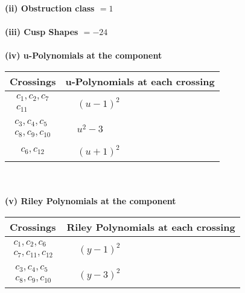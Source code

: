 \documentclass[1p]{elsarticle_modified}
\theoremstyle{definition}
\begin{document}
\flushleft \textbf{(ii) Obstruction class $= 1$}\\~\\
\flushleft \textbf{(iii) Cusp Shapes $= -24$}\\~\\
\newpage\renewcommand{\arraystretch}{1}
\flushleft \textbf{(iv) u-Polynomials at the component}\newline \\
\begin{tabular}{m{50pt}|m{274pt}}
Crossings & \hspace{64pt}u-Polynomials at each crossing \\
\hline $$\begin{aligned}c_{1},c_{2},c_{7}\\c_{11}\end{aligned}$$&$\begin{aligned}
&(u-1)^2
\end{aligned}$\\
\hline $$\begin{aligned}c_{3},c_{4},c_{5}\\c_{8},c_{9},c_{10}\end{aligned}$$&$\begin{aligned}
&u^2-3
\end{aligned}$\\
\hline $$\begin{aligned}c_{6},c_{12}\end{aligned}$$&$\begin{aligned}
&(u+1)^2
\end{aligned}$\\
\hline
\end{tabular}\\~\\
\newpage\renewcommand{\arraystretch}{1}
\flushleft \textbf{(v) Riley Polynomials at the component}\newline \\
\begin{tabular}{m{50pt}|m{274pt}}
Crossings & \hspace{64pt}Riley Polynomials at each crossing \\
\hline $$\begin{aligned}c_{1},c_{2},c_{6}\\c_{7},c_{11},c_{12}\end{aligned}$$&$\begin{aligned}
&(y-1)^2
\end{aligned}$\\
\hline $$\begin{aligned}c_{3},c_{4},c_{5}\\c_{8},c_{9},c_{10}\end{aligned}$$&$\begin{aligned}
&(y-3)^2
\end{aligned}$\\
\hline
\end{tabular}\\~\\
\end{document}

